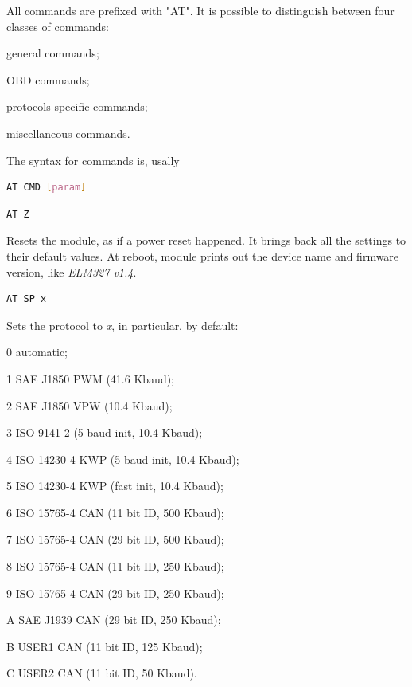 \documentclass[twoside]{article}
\begin{document}
\begin{multicols}{2}
All commands are prefixed with "AT". It is possible to distinguish between four classes of commands:
\begin{compactitem}
  \item general commands;
  \item OBD commands;
  \item protocols specific commands;
  \item miscellaneous commands.
\end{compactitem}

The syntax for commands is, usally
\begin{lstlisting}[language=bash]
AT CMD [param]
\end{lstlisting}

\begin{lstlisting}[language=bash]
AT Z
\end{lstlisting}

Resets the module, as if a power reset happened.
It brings back all the settings to their default values.
At reboot, module prints out the device name and firmware version, like \emph{ELM327 v1.4}.

\begin{lstlisting}[language=bash]
AT SP x
\end{lstlisting}

Sets the protocol to \emph{x}, in particular, by default:
\begin{compactitem}
  \item 0 automatic;
  \item 1 SAE J1850 PWM (41.6 Kbaud);
  \item 2 SAE J1850 VPW (10.4 Kbaud);
  \item 3 ISO 9141-2 (5 baud init, 10.4 Kbaud);
  \item 4 ISO 14230-4 KWP (5 baud init, 10.4 Kbaud);
  \item 5 ISO 14230-4 KWP (fast init, 10.4 Kbaud);
  \item 6 ISO 15765-4 CAN (11 bit ID, 500 Kbaud);
  \item 7 ISO 15765-4 CAN (29 bit ID, 500 Kbaud);
  \item 8 ISO 15765-4 CAN (11 bit ID, 250 Kbaud);
  \item 9 ISO 15765-4 CAN (29 bit ID, 250 Kbaud);
  \item A SAE J1939 CAN (29 bit ID, 250 Kbaud);
  \item B USER1 CAN (11 bit ID, 125 Kbaud);
  \item C USER2 CAN (11 bit ID, 50 Kbaud).
\end{compactitem}


\end{multicols}
\end{document}
